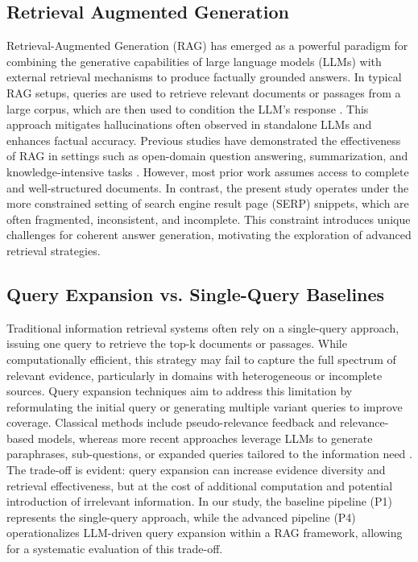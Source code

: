 \documentclass[manuscript,screen]{acmart}
\begin{document}
\begin{CCSXML}
\subsection{Retrieval Augmented Generation}
Retrieval-Augmented Generation (RAG) has emerged as a powerful paradigm for combining the generative capabilities of large language models (LLMs) with external retrieval mechanisms to produce factually grounded answers. In typical RAG setups, queries are used to retrieve relevant documents or passages from a large corpus, which are then used to condition the LLM’s response \cite{izacard-grave-2021-leveraging,NEURIPS2020_6b493230}. This approach mitigates hallucinations often observed in standalone LLMs and enhances factual accuracy. Previous studies have demonstrated the effectiveness of RAG in settings such as open-domain question answering, summarization, and knowledge-intensive tasks \cite{karpukhin-etal-2020-dense,guu2020realmretrievalaugmentedlanguagemodel}. However, most prior work assumes access to complete and well-structured documents. In contrast, the present study operates under the more constrained setting of search engine result page (SERP) snippets, which are often fragmented, inconsistent, and incomplete. This constraint introduces unique challenges for coherent answer generation, motivating the exploration of advanced retrieval strategies.

\subsection{Query Expansion vs. Single-Query Baselines}
Traditional information retrieval systems often rely on a single-query approach, issuing one query to retrieve the top-k documents or passages. While computationally efficient, this strategy may fail to capture the full spectrum of relevant evidence, particularly in domains with heterogeneous or incomplete sources. Query expansion techniques aim to address this limitation by reformulating the initial query or generating multiple variant queries to improve coverage. Classical methods include pseudo-relevance feedback and relevance-based models, whereas more recent approaches leverage LLMs to generate paraphrases, sub-questions, or expanded queries tailored to the information need \cite{nogueira2020passagererankingbert,wang-etal-2023-query2doc}. The trade-off is evident: query expansion can increase evidence diversity and retrieval effectiveness, but at the cost of additional computation and potential introduction of irrelevant information. In our study, the baseline pipeline (P1) represents the single-query approach, while the advanced pipeline (P4) operationalizes LLM-driven query expansion within a RAG framework, allowing for a systematic evaluation of this trade-off.


\end{CCSXML}
\end{document}
